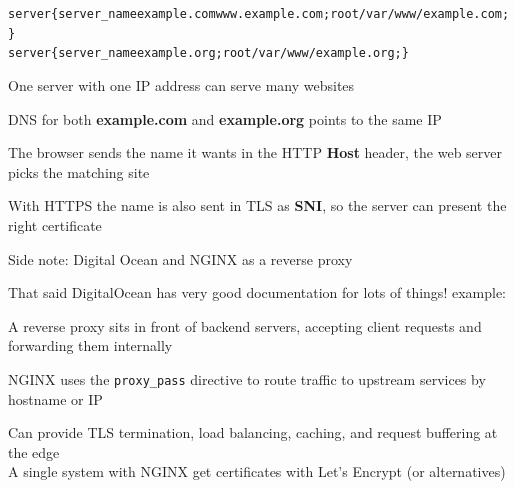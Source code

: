 \documentclass[Screen16to9,17pt]{foils}
\begin{document}



\breakdance




\begin{alltt}\footnotesize
server \{ server_name example.com www.example.com; root /var/www/example.com; \}
server \{ server_name example.org; root /var/www/example.org; \}
\end{alltt}


\begin{list2}
\item One server with one IP address can serve many websites
\item DNS for both {\bf example.com} and {\bf example.org} points to the same IP
\item The browser sends the name it wants in the HTTP {\bf Host} header, the web server picks the matching site
\item With HTTPS the name is also sent in TLS as {\bf SNI}, so the server can present the right certificate
\end{list2}

Side note: Digital Ocean and NGINX as a reverse proxy

That said DigitalOcean has very good documentation for lots of things! example:\\



\begin{list2}
\item A reverse proxy sits in front of backend servers, accepting client requests and forwarding them internally
\item NGINX uses the \verb+proxy_pass+ directive to route traffic to upstream services by hostname or IP
\item Can provide TLS termination, load balancing, caching, and request buffering at the edge\\
A single system with NGINX get certificates with Let's Encrypt (or alternatives)
\end{list2}
\end{document}
